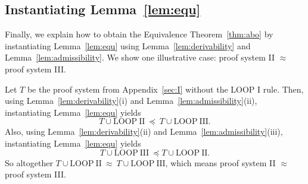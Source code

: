 \documentclass[runningheads]{llncs}       %
\begin{document}
\subsection{Instantiating Lemma~\ref{lem:equ}}
\label{subsec:instantiate}

Finally, we explain how to obtain the Equivalence Theorem~\ref{thm:abo} by instantiating Lemma~\ref{lem:equ}
using Lemma~\ref{lem:derivability} and Lemma~\ref{lem:admissibility}.
We show one illustrative case: proof system II $\approx$ proof system III.

Let $T$ be the proof system from Appendix~\ref{sec:I} without the LOOP I rule.
Then, using Lemma~\ref{lem:derivability}(i) and Lemma~\ref{lem:admissibility}(ii), 
instantiating Lemma~\ref{lem:equ} yields
\[
 T \cup \mathrm{LOOP\ II}\ \preceq\ T \cup \mathrm{LOOP\ III}.
\]
Also, using Lemma~\ref{lem:derivability}(ii) and Lemma~\ref{lem:admissibility}(iii), 
instantiating Lemma~\ref{lem:equ} yields
\[
 T \cup \mathrm{LOOP\ III}\ \preceq T \cup \mathrm{LOOP\ II}.
\]
So altogether $T \cup \mathrm{LOOP\ II}\ \approx\ T \cup \mathrm{LOOP\ III}$,
which means proof system II $\approx$ proof system III.




%
\end{document}
